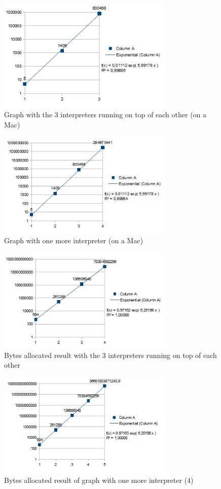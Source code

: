\documentclass{article}
\begin{document}
\begin{figure}[h!]
  \caption{Graph with the 3 interpreters running on top of each other (on a Mac)}
  \centering
    \includegraphics[width=0.75\textwidth]{AndersGraf3}
\end{figure}

\begin{figure}[h!]
  \caption{Graph with one more interpreter (on a Mac)}
  \centering
    \includegraphics[width=0.75\textwidth]{AndersGraf4}
\end{figure}

\begin{figure}[h!]
  \caption{Bytes allocated result with the 3 interpreters running on top of each other}
  \centering
    \includegraphics[width=0.75\textwidth]{HanusGrafBytesAllocatet3}
\end{figure}

\begin{figure}[h!]
  \caption{Bytes allocated result of graph with one more interpreter (4)}
  \centering
    \includegraphics[width=0.75\textwidth]{HanusGrafBytesAllocatet4}
\end{figure}
\end{document}
